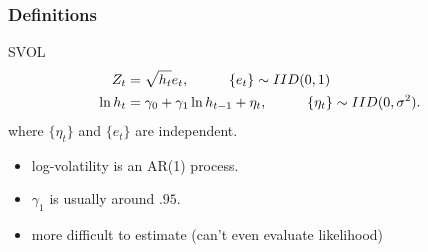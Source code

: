 \documentclass{beamer}
\begin{document}
\begin{frame}
\frametitle{Definitions}

\begin{block}{SVOL}
\begin{align*}
Z_t &= \sqrt{h_t}e_t, \hspace{10mm} \{e_t\} \sim IID(0,1) \\
\ln h_t &= \gamma_0 + \gamma_1 \ln h_{t-1} + \eta_t, \hspace{10mm} \{\eta_t\} \sim IID(0,\sigma^2). 
\end{align*}
where $\{\eta_t\}$ and $\{e_t\}$ are independent.
\end{block}

\begin{itemize}
\item log-volatility is an AR(1) process. 
\item $\gamma_1$ is usually around $.95$.
\item more difficult to estimate (can't even evaluate likelihood)
\end{itemize}


\end{frame}
\end{document}
